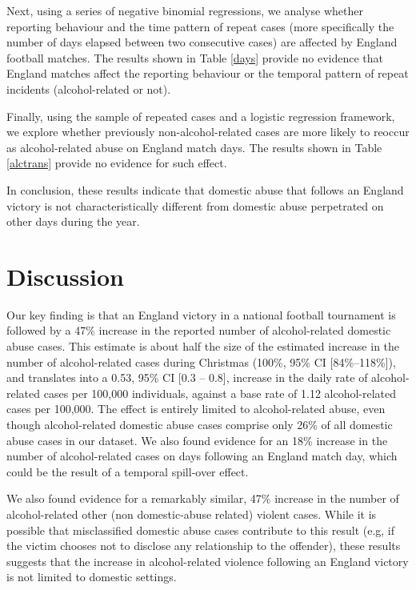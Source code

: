 \documentclass[12pt, a4paper]{article}
\begin{document}
Next, using a series of negative binomial regressions, we analyse whether reporting behaviour and the time pattern of repeat cases (more specifically the number of days elapsed between two consecutive cases) are affected by England football matches. The results shown in Table \ref{days} provide no evidence that England matches affect the reporting behaviour or the temporal pattern of repeat incidents (alcohol-related or not).




Finally, using the sample of repeated cases and a logistic regression framework, we explore whether previously non-alcohol-related cases are more likely to reoccur as alcohol-related abuse on England match days. The results shown in Table \ref{alctrans} provide no evidence for such effect.

In conclusion, these results indicate that domestic abuse that follows an England victory is not characteristically different from domestic abuse perpetrated on other days during the year.

\clearpage

\section*{Discussion}

Our key finding is that an England victory in a national football tournament is followed by a 47\% increase in the reported number of alcohol-related domestic abuse cases. This estimate is about half the size of the estimated increase in the number of alcohol-related cases during Christmas (100\%, 95\% CI [84\%--118\%]), and translates into a 0.53, 95\% CI [0.3 -- 0.8], increase in the daily rate of alcohol-related cases per 100,000 individuals, against a base rate of 1.12 alcohol-related cases per 100,000. The effect is entirely limited to alcohol-related abuse, even though alcohol-related domestic abuse cases comprise only 26\% of all domestic abuse cases in our dataset. We also found evidence for an 18\% increase in the number of alcohol-related cases on days following an England match day, which could be the result of a temporal spill-over effect.


We also found evidence for a remarkably similar, 47\% increase in the number of alcohol-related other (non domestic-abuse related) violent cases. While it is possible that misclassified domestic abuse cases contribute to this result (e.g, if the victim chooses not to disclose any relationship to the offender), these results suggests that the increase in alcohol-related violence following an England victory is not limited to domestic settings.
\end{document}
